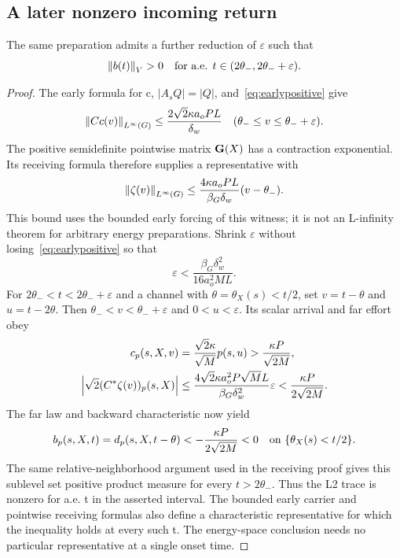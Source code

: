\subsection{A later nonzero incoming return}
\begin{proposition}\label{prop:return}
The same preparation admits a further reduction of $\varepsilon$ such that
\begin{equation}\label{eq:returnnonzero}
\left\lVert b(t)\right\rVert_V>0\quad\textnormal{for a.e. }t\in(2\theta_-,2\theta_-+\varepsilon).
\end{equation}
\end{proposition}
\begin{proof}
The early formula for c, $|A_sQ|=|Q|$, and~\eqref{eq:earlypositive} give
\begin{equation}\label{eq:earlyCbound}
\left\lVert Cc(v)\right\rVert_{L^\infty(G)}\le\frac{2\sqrt2\kappa a_oPL}{\delta_w}
\quad(\theta_-\le v\le\theta_-+\varepsilon).
\end{equation}
The positive semidefinite pointwise matrix $\mathbf G(X)$ has a contraction exponential. Its receiving formula therefore supplies a representative with
\begin{equation}\label{eq:earlyzetabound}
\left\lVert\zeta(v)\right\rVert_{L^\infty(G)}\le
\frac{4\kappa a_oPL}{\beta_G\delta_w}(v-\theta_-).
\end{equation}
This bound uses the bounded early forcing of this witness; it is not an L-infinity theorem for arbitrary energy preparations. Shrink $\varepsilon$ without losing~\eqref{eq:earlypositive} so that
\begin{equation}\label{eq:epsreturn}
\varepsilon<\frac{\beta_G\delta_w^2}{16a_o^2ML}.
\end{equation}
For $2\theta_-<t<2\theta_-+\varepsilon$ and a channel with $\theta=\theta_X(s)<t/2$, set $v=t-\theta$ and $u=t-2\theta$. Then $\theta_-<v<\theta_-+\varepsilon$ and $0<u<\varepsilon$. Its scalar arrival and far effort obey
\begin{align}
c_p(s,X,v)&=\frac{\sqrt2\kappa}{\sqrt M}p(s,u)>
\frac{\kappa P}{\sqrt{2M}},\notag\\
\left|\sqrt2(C^*\zeta(v))_p(s,X)\right|&\le
\frac{4\sqrt2\kappa a_o^2P\sqrt M L}{\beta_G\delta_w^2}\varepsilon
<\frac{\kappa P}{2\sqrt{2M}}.\label{eq:effortbound}
\end{align}
The far law and backward characteristic now yield
\begin{equation}\label{eq:negativeb}
b_p(s,X,t)=d_p(s,X,t-\theta)<-\frac{\kappa P}{2\sqrt{2M}}<0
\quad\textnormal{on }\{\theta_X(s)<t/2\}.
\end{equation}
The same relative-neighborhood argument used in the receiving proof gives this sublevel set positive product measure for every $t>2\theta_-$. Thus the L2 trace is nonzero for a.e. t in the asserted interval. The bounded early carrier and pointwise receiving formulas also define a characteristic representative for which the inequality holds at every such t. The energy-space conclusion needs no particular representative at a single onset time.
\end{proof}

